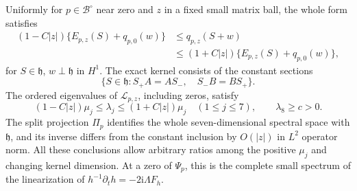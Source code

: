 \begin{theorem}\label{thm:complete-bundle-spectrum}
Uniformly for $p\in\mathcal B^\circ$ near zero and $z$
in a fixed small matrix ball, the whole form satisfies
\begin{equation}\label{eq:whole-bundle-form}
 \begin{split}
 (1-C|z|)\{E_{p,z}(S)+q_{p,0}(w)\}
 &\le q_{p,z}(S+w)\\
 &\le(1+C|z|)\{E_{p,z}(S)+q_{p,0}(w)\},
 \end{split}
\end{equation}
for $S\in\mathfrak h$, $w\perp\mathfrak h$ in $H^1$.
The exact kernel consists of the constant sections
\begin{equation}\label{eq:actual-stabilizer-kernel}
 \{S\in\mathfrak h:S_+A=AS_-,\quad S_-B=BS_+\}.
\end{equation}
The ordered eigenvalues of $\mathcal L_{p,z}$, including
zeros, satisfy
\begin{equation}\label{eq:seven-eigenvalues}
 (1-C|z|)\mu_j\le\lambda_j\le(1+C|z|)\mu_j
       \quad(1\le j\le7),\qquad\lambda_8\ge c>0.
\end{equation}
The split projection $\Pi_p$ identifies the whole
seven-dimensional spectral space with $\mathfrak h$,
and its inverse differs from the constant inclusion by
$O(|z|)$ in $L^2$ operator norm. All these conclusions
allow arbitrary ratios among the positive $\mu_j$ and
changing kernel dimension.
At a zero of $\Psi_p$, this is the complete small spectrum
of the linearization of
$h^{-1}\partial_th=-2\mathrm i\Lambda F_h$.
\end{theorem}

